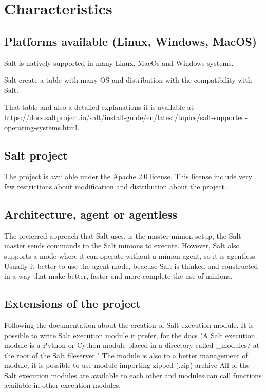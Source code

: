 \documentclass[12pt,a4paper,openright,twoside]{book}
\begin{document}
\section{Characteristics}

\subsection{Platforms available (Linux, Windows, MacOS)}
Salt is natively supported in many Linux, MacOs and Windows systems.


Salt create a table with many OS and distribution with the compatibility with Salt.


That table and also a detailed explanations it is available at \url{https://docs.saltproject.io/salt/install-guide/en/latest/topics/salt-supported-operating-systems.html}.

\subsection{Salt project}
The project is available under the Apache 2.0 license. This license include very few restrictions about modification and distribution about the project.

\subsection{Architecture, agent or agentless}
The preferred approach that Salt uses, is the master-minion setup, the Salt master sends commands to the Salt minions to execute.
However, Salt also supports a mode where it can operate without a minion agent, so it is agentless.
Usually it better to use the agent mode, beacuse Salt is thinked and constructed in a way that make better, faster and more complete the use of minions.


\subsection{Extensions of the project}
Following the documentation about the creation of Salt execution module\cite{saltDocModules}.
It is possible to write Salt execution module it prefer, for the docs "A Salt execution module is a Python or Cython module placed in a directory called \_modules/ at the root of the Salt fileserver."
The module is also to a better management of module, it is possible to use module importing zipped (.zip) archive
All of the Salt execution modules are available to each other and modules can call functions available in other execution modules.
\end{document}
